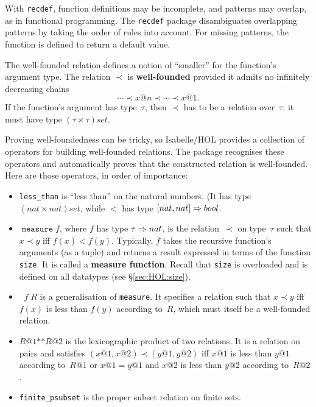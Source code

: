 With \texttt{recdef}, function definitions may be incomplete, and patterns may
overlap, as in functional programming.  The \texttt{recdef} package
disambiguates overlapping patterns by taking the order of rules into account.
For missing patterns, the function is defined to return a default value.


The well-founded relation defines a notion of ``smaller'' for the function's
argument type.  The relation $\prec$ is \textbf{well-founded} provided it
admits no infinitely decreasing chains
\[ \cdots\prec x@n\prec\cdots\prec x@1. \]
If the function's argument has type~$\tau$, then $\prec$ has to be a relation
over~$\tau$: it must have type $(\tau\times\tau)set$.

Proving well-foundedness can be tricky, so Isabelle/HOL provides a collection
of operators for building well-founded relations.  The package recognises
these operators and automatically proves that the constructed relation is
well-founded.  Here are those operators, in order of importance:
\begin{itemize}
\item \texttt{less_than} is ``less than'' on the natural numbers.
  (It has type $(nat\times nat)set$, while $<$ has type $[nat,nat]\Rightarrow bool$.
  
\item $\mathop{\mathtt{measure}} f$, where $f$ has type $\tau\Rightarrow nat$, is the
  relation~$\prec$ on type~$\tau$ such that $x\prec y$ iff $f(x)<f(y)$.
  Typically, $f$ takes the recursive function's arguments (as a tuple) and
  returns a result expressed in terms of the function \texttt{size}.  It is
  called a \textbf{measure function}.  Recall that \texttt{size} is overloaded
  and is defined on all datatypes (see \S\ref{sec:HOL:size}).
                                                    
\item $\mathop{\mathtt{inv_image}} f\;R$ is a generalisation of
  \texttt{measure}.  It specifies a relation such that $x\prec y$ iff $f(x)$
  is less than $f(y)$ according to~$R$, which must itself be a well-founded
  relation.

\item $R@1\texttt{**}R@2$ is the lexicographic product of two relations.  It
  is a relation on pairs and satisfies $(x@1,x@2)\prec(y@1,y@2)$ iff $x@1$
  is less than $y@1$ according to~$R@1$ or $x@1=y@1$ and $x@2$
  is less than $y@2$ according to~$R@2$.

\item \texttt{finite_psubset} is the proper subset relation on finite sets.
\end{itemize}

